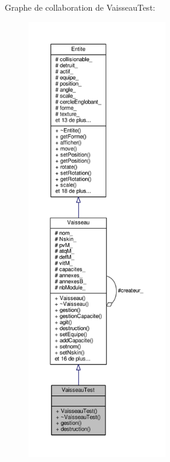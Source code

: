 Graphe de collaboration de Vaisseau\+Test\+:\nopagebreak
\begin{figure}[H]
\begin{center}
\leavevmode
\includegraphics[height=550pt]{class_vaisseau_test__coll__graph}
\end{center}
\end{figure}
